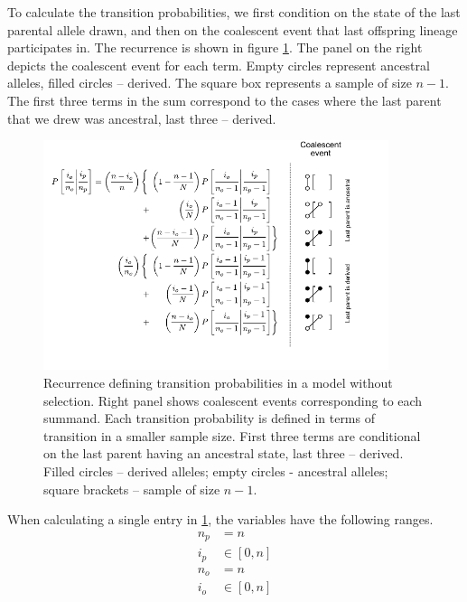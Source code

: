 \documentclass[review]{elsarticle}
\begin{document}
To calculate the transition probabilities, we first condition on the state of the last parental
allele drawn, and then on the coalescent event that last offspring lineage participates in. The
recurrence is shown in figure \ref{fig:rec-neutral}. The panel on the right depicts the coalescent
event for each term. Empty circles represent ancestral alleles, filled circles -- derived. The
square box represents a sample of size $n-1$. The first three terms in the sum correspond to the
cases where the last parent that we drew was ancestral, last three -- derived.

\begin{figure}
  \centering
  \includegraphics[width=0.9\textwidth]{fig/recurrence-neutral-annotated.pdf}
  \caption{Recurrence defining transition probabilities in a model without selection. Right panel
    shows coalescent events corresponding to each summand. Each transition probability is defined in
    terms of transition in a smaller sample size. First three terms are conditional on the last
    parent having an ancestral state, last three -- derived. Filled circles -- derived alleles;
    empty circles - ancestral alleles; square brackets -- sample of size $n-1$.}
  \label{fig:rec-neutral}
\end{figure}

When calculating a single entry in \ref{fig:rec-neutral}, the variables have the following ranges.
\begin{equation}
  \begin{aligned}
    n_p &= n \\
    i_p &\in [0, n] \\
    n_o &= n \\
    i_o &\in [0, n] \\
  \end{aligned}
\end{equation}
\end{document}
